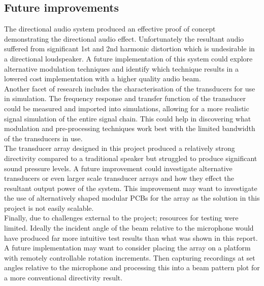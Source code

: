 \subsection{Future improvements}
The directional audio system produced an effective proof of concept demonstrating the directional audio effect. Unfortunately the resultant audio suffered from significant 1st and 2nd harmonic distortion which is undesirable in a directional loudspeaker. A future implementation of this system could explore alternative modulation techniques and identify which technique results in a lowered cost implementation with a higher quality audio beam.\\
Another facet of research includes the characterisation of the transducers for use in simulation. The frequency response and transfer function of the transducer could be measured and imported into simulations, allowing for a more realistic signal simulation of the entire signal chain. This could help in discovering what modulation and pre-processing techniques work best with the limited bandwidth of the transducers in use.\\
The transducer array designed in this project produced a relatively strong directivity compared to a traditional speaker but struggled to produce significant sound pressure levels. A future improvement could investigate alternative transducers or even larger scale transducer arrays and how they effect the resultant output power of the system. This improvement may want to investigate the use of alternatively shaped modular PCBs for the array as the solution in this project is not easily scalable.\\
Finally, due to challenges external to the project; resources for testing were limited. Ideally the incident angle of the beam relative to the microphone would have produced far more intuitive test results than what was shown in this report. A future implementation may want to consider placing the array on a platform with remotely controllable rotation increments. Then capturing recordings at set angles relative to the microphone and processing this into a beam pattern plot for a more conventional directivity result.